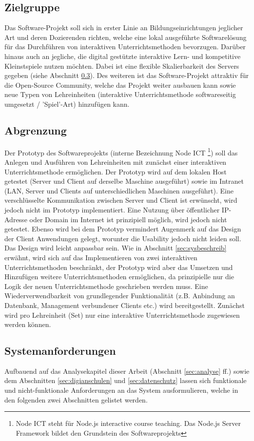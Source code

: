 \subsection{Zielgruppe}\label{sec:zielgruppe}
Das Software-Projekt soll sich in erster Linie an Bildungseinrichtungen jeglicher Art und deren Dozierenden richten, welche eine lokal ausgeführte Softwarelösung für das Durchführen von interaktiven Unterrichtsmethoden bevorzugen. Darüber hinaus auch an jegliche, die digital gestützte interaktive Lern- und kompetitive Kleinstspiele nutzen möchten. Dabei ist eine flexible Skalierbarkeit des Servers gegeben (siehe Abschnitt \ref{sec:anforderung}). Des weiteren ist das Software-Projekt attraktiv für die Open-Source Community, welche das Projekt weiter ausbauen kann sowie neue Typen von Lehreinheiten (interaktive Unterrichtsmethode softwareseitig umgesetzt / 'Spiel'-Art) hinzufügen kann.
\subsection{Abgrenzung}\label{sec:abgrenz}
Der Prototyp des Softwareprojekts (interne Bezeichnung Node ICT \footnote{Node ICT steht für Node.js interactive course teaching. Das Node.js Server Framework bildet den Grundstein des Softwareprojekts}) soll das Anlegen und Ausführen von Lehreinheiten mit zunächst einer interaktiven Unterrichtsmethode ermöglichen. Der Prototyp wird auf dem lokalen Host getestet (Server und Client auf derselbe Maschine ausgeführt) sowie im Intranet (LAN, Server und Clients auf unterschiedlichen Maschinen ausgeführt). Eine verschlüsselte Kommunikation zwischen Server und Client ist erwünscht, wird jedoch nicht im Prototyp implementiert. Eine Nutzung über öffentlicher IP-Adresse oder Domain im Internet ist prinzipiell möglich, wird jedoch nicht getestet. Ebenso wird bei dem Prototyp vermindert Augenmerk auf das Design der Client Anwendungen gelegt, worunter die Usability jedoch nicht leiden soll. Das Design wird leicht anpassbar sein. Wie in Abschnitt \ref{sec:sysbeschreib} erwähnt, wird sich auf das Implementieren von zwei interaktiven Unterrichtsmethoden beschränkt, der Prototyp wird aber das Umsetzen und Hinzufügen weitere Unterrichtsmethoden ermöglichen, da prinzipielle nur die Logik der neuen Unterrichtsmethode geschrieben werden muss. Eine Wiederverwendbarkeit von grundlegender Funktionalität (z.B. Anbindung an Datenbank, Management verbundener Clients etc.) wird bereitgestellt. Zunächst wird pro Lehreinheit (Set) nur eine interaktive Unterrichtsmethode zugewiesen werden können.  
\subsection{Systemanforderungen}\label{sec:anforderung}
Aufbauend auf das Analysekapitel dieser Arbeit (Abschnitt \ref{sec:analyse} ff.) sowie dem Abschnitten \ref{sec:digianschulen} und \ref{sec:datenschutz} lassen sich funktionale und nicht-funktionale Anforderungen an das System ausformulieren, welche in den folgenden zwei Abschnitten gelistet werden.

